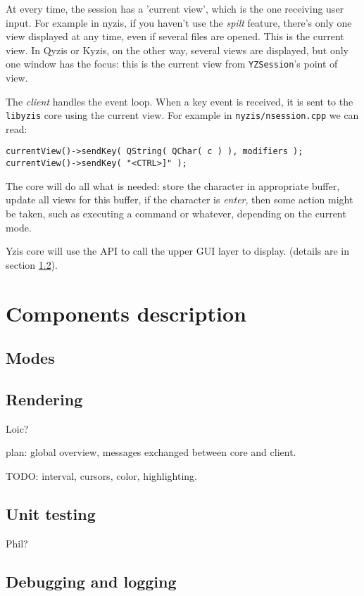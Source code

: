 \documentclass[a4paper,12pt]{report}
\begin{document}
At every time, the session has a 'current view', which is the one receiving
user input. For example in nyzis, if you haven't use the \emph{spilt}
feature, there's only one view displayed at any time, even if several
files are opened.  This is the current view. In Qyzis or Kyzis, on the
other way, several views are displayed, but only one window has the focus:
this is the current view from \verb+YZSession+'s point of view.

The \emph{client} handles the event loop. When a key event is received, it is sent
to the \verb+libyzis+ core using the current view. For example in
\verb+nyzis/nsession.cpp+ we can read:
\begin{verbatim}
currentView()->sendKey( QString( QChar( c ) ), modifiers );
currentView()->sendKey( "<CTRL>]" );
\end{verbatim}

The core will do all what is needed: store the character in appropriate
buffer, update all views for this buffer, if the character is \emph{enter},
then some action might be taken, such as executing a command or whatever,
depending on the current mode.

Yzis core will use the API to call the upper GUI layer to display. (details
are in section \ref{rendering}).



\chapter{Components description}

\section{Modes}


\section{Rendering}
\label{rendering}

Loic?

plan: global overview, messages exchanged between core and client.

TODO: interval, cursors, color, highlighting.

\section{Unit testing}

Phil?

\section{Debugging and logging}
\end{document}
